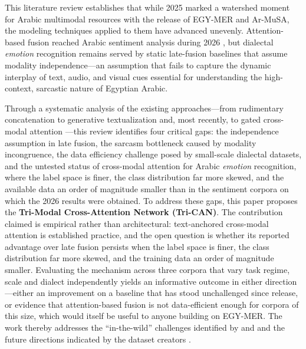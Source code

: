 \documentclass[12pt, a4paper]{article}
\begin{document}
This literature review establishes that while 2025 marked a watershed moment for Arabic multimodal resources with the release of EGY-MER and Ar-MuSA, the modeling techniques applied to them have advanced unevenly. Attention-based fusion reached Arabic sentiment analysis during 2026 \citep{Cheikhi2026, Cheikhi2026a}, but dialectal \emph{emotion} recognition remains served by static late-fusion baselines that assume modality independence---an assumption that fails to capture the dynamic interplay of text, audio, and visual cues essential for understanding the high-context, sarcastic nature of Egyptian Arabic.

Through a systematic analysis of the existing approaches---from rudimentary concatenation to generative textualization and, most recently, to gated cross-modal attention \citep{Cheikhi2026}---this review identifies four critical gaps: the independence assumption in late fusion, the sarcasm bottleneck caused by modality incongruence, the data efficiency challenge posed by small-scale dialectal datasets, and the untested status of cross-modal attention for Arabic \emph{emotion} recognition, where the label space is finer, the class distribution far more skewed, and the available data an order of magnitude smaller than in the sentiment corpora on which the 2026 results were obtained. To address these gaps, this paper proposes the \textbf{Tri-Modal Cross-Attention Network (Tri-CAN)}. The contribution claimed is empirical rather than architectural: text-anchored cross-modal attention is established practice, and the open question is whether its reported advantage over late fusion persists when the label space is finer, the class distribution far more skewed, and the training data an order of magnitude smaller. Evaluating the mechanism across three corpora that vary task regime, scale and dialect independently yields an informative outcome in either direction---either an improvement on a baseline that has stood unchallenged since release, or evidence that attention-based fusion is not data-efficient enough for corpora of this size, which would itself be useful to anyone building on EGY-MER. The work thereby addresses the ``in-the-wild'' challenges identified by \citet{Hussien2018} and \citet{Rahma2023} and the future directions indicated by the dataset creators \citep{Hussein2025}.




\end{document}
